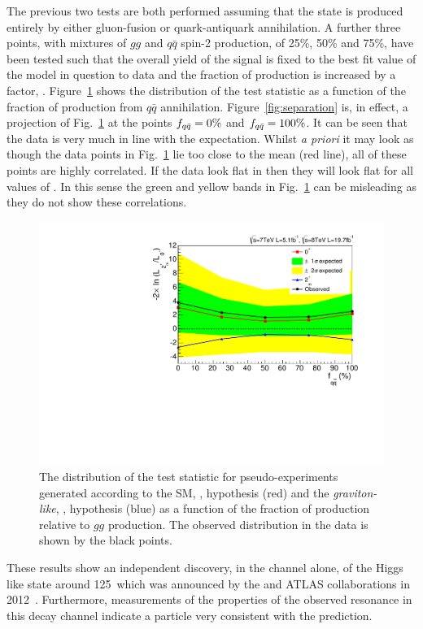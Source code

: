 The previous two tests are both performed assuming that the \twomp state is produced entirely by either gluon-fusion or quark-antiquark annihilation. A further three points, with mixtures of $gg$ and $q\bar{q}$ spin-2 production, of 25\%, 50\% and 75\%, have been tested such that the overall yield of the \twomp signal is fixed to the best fit value of the model in question to data and the fraction of \qqbar production is increased by a factor, \fqqbar. Figure~\ref{fig:qqbar} shows the distribution of the test statistic as a function of the fraction of \twomp production from $q\bar{q}$ annihilation. Figure~\ref{fig:separation} is, in effect, a projection of Fig.~\ref{fig:qqbar} at the points $f_{q\bar{q}}=0\%$ and $f_{q\bar{q}}=100\%$. It can be seen that the data is very much in line with the \SM expectation. Whilst \textit{a priori} it may look as though the data points in Fig.~\ref{fig:qqbar} lie too close to the \SM mean (red line), all of these points are highly correlated. If the data look flat in \abscostheta then they will look flat for all values of \fqqbar. In this sense the green and yellow bands in Fig.~\ref{fig:qqbar} can be misleading as they do not show these correlations.

\begin{figure}
  \begin{center}
    \includegraphics[width=0.8\linewidth]{results/plots/fqqbar.pdf}
    \caption[Distribution of the test statistic as a function of \fqqbar for the spin analysis]{The distribution of the test statistic for pseudo-experiments generated according to the SM, \zerop, hypothesis (red) and the \emph{graviton-like}, \twomp, hypothesis (blue) as a function of the fraction of \qqbar production relative to $gg$ production. The observed distribution in the data is shown by the black points.}
    \label{fig:qqbar}
  \end{center}
\end{figure}

These results show an independent discovery, in the \Hgg channel alone, of the Higgs like state around 125~\GeV which was announced by the \CMS and ATLAS collaborations in 2012~\cite{CMSDiscovery,ATLASDiscovery}. Furthermore, measurements of the properties of the observed resonance in this decay channel indicate a particle very consistent with the \SM prediction.


